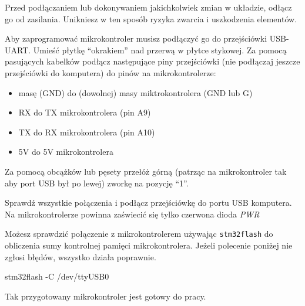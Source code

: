 \documentclass{pdfBooklets}
\begin{document}
\begin{ProTip}{}
  Przed podłączaniem lub dokonywaniem jakichkolwiek zmian w układzie, odłącz go od zasilania. Unikniesz
  w ten sposób ryzyka zwarcia i uszkodzenia elementów.
\end{ProTip}

Aby zaprogramować mikrokontroler musisz podłączyć go do przejściówki USB-UART. Umieść płytkę ``okrakiem'' nad przerwą
w płytce stykowej. Za pomocą pasujących kabelków podłącz następujące piny przejściówki (nie podłączaj jeszcze
przejściówki do komputera) do pinów na mikrokontrolerze:
\begin{itemize}
\item masę (GND) do (dowolnej) masy miktrokontrolera (GND lub G)
\item RX do TX mikrokontrolera (pin A9)
\item TX do RX mikrokontrolera (pin A10)
\item 5V do 5V mikrokontrolera
\end{itemize}

Za pomocą obcążków lub pęsety przełóż górną (patrząc na mikrokontroler tak aby port USB był po lewej) zworkę na
pozycję ``1''.

Sprawdź wszystkie połączenia i podłącz przejściówkę do portu USB komputera. Na mikrokontrolerze powinna zaświecić się tylko czerwona dioda
\textit{PWR}

Możesz sprawdzić połączenie z mikrokontrolerem używając \Verb$stm32flash$ do obliczenia sumy kontrolnej pamięci mikrokontrolera.
Jeżeli polecenie poniżej nie zgłosi błędów, wszystko działa poprawnie.

\begin{CodeFrame*}[bash]{}
stm32flash -C /dev/ttyUSB0
\end{CodeFrame*}

Tak przygotowany mikrokontroler jest gotowy do pracy.
\end{document}
